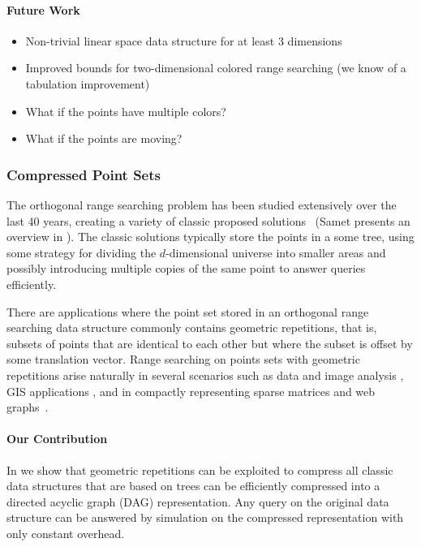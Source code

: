 \paragraph{Future Work}
\begin{itemize}
    \item Non-trivial linear space data structure for at least 3 dimensions
    \item Improved bounds for two-dimensional colored range searching (we know of a tabulation improvement)
    \item What if the points have multiple colors?
    \item What if the points are moving?
\end{itemize}

\clearpage
\subsubsection{Compressed Point Sets}
The orthogonal range searching problem has been studied extensively over the last 40 years, creating a variety of classic proposed solutions~\cite{bentley1975multidimensional, bentley1979multidimensional, orenstein1982multidimensional, bentley1980decomposable, lueker1978data, lee1980quintary, guttman1984r, clarkson1983fast, kanth1999optimal, van1991dividedk, gaede1998multidimensional, bayer1972organization, arge2008priority, robinson1981kdb, procopiuc2003bkd, comer1979ubiquitous, eppstein2008skip} (Samet presents an overview in \cite{samet1990applications}). The classic solutions typically store the points in a some tree, using some strategy for dividing the $d$-dimensional universe into smaller areas and possibly introducing multiple copies of the same point to answer queries efficiently. 

There are applications where the point set stored in an orthogonal range searching data structure commonly contains geometric repetitions, that is, subsets of points that are identical to each other but where the subset is offset by some translation vector.
Range searching on points sets with geometric repetitions arise naturally in several scenarios such as data and image analysis \cite{tetko2001pattern, pajarola2000image, dick2009a}, GIS applications \cite{schindler2008detecting, zhu2002efficient, haegler2010a, dick2009a}, and in compactly representing sparse matrices and web graphs~\cite{Galli98compressionof, brisaboa2009k2, brisaboaainterleaved, de2013compact}.

\paragraph{Our Contribution} 
In  we show that geometric repetitions can be exploited to compress all classic data structures that are based on trees can be efficiently compressed into a directed acyclic graph (DAG) representation. Any query on the original data structure can be answered by simulation on the compressed representation with only constant overhead. 

